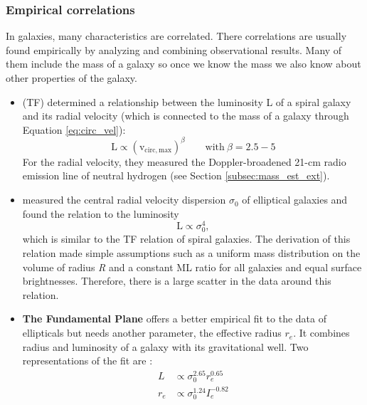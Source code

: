 \subsubsection{Empirical correlations}
In galaxies, many characteristics are correlated. There correlations are usually found empirically by analyzing and combining observational results. Many of them include the mass of a galaxy so once we know the mass we also know about other properties of the galaxy. 
\begin{itemize}
    \item \textbf{\citet{Tully...Fisher...1977}} (TF) determined a relationship between the luminosity L of a spiral galaxy and its radial velocity (which is connected to the mass of a galaxy through Equation \ref{eq:circ_vel}):
    \begin{equation}
        \mathrm{L \propto (v_{circ, max})}^\beta \qquad \mathrm{with}\ \beta =  2.5 - 5
    \end{equation}
    For the radial velocity, they measured the Doppler-broadened 21-cm radio emission line of neutral hydrogen (see Section \ref{subsec:mass_est_ext}). 
    \item \textbf{\citet{Faber...Jackson...1976}} measured the central radial velocity dispersion $\sigma_0$ of elliptical galaxies and found the relation to the luminosity  
    \begin{equation}
        \mathrm{L} \propto \sigma_0^4,
    \end{equation}
    which is similar to the \acs{TF} relation of spiral galaxies. The derivation of this relation made simple assumptions such as a uniform mass distribution on the volume of radius \textit{R} and a constant \ac{ML} ratio for all galaxies and equal surface brightnesses. Therefore, there is a large scatter in the data around this relation.
    \item \textbf{The Fundamental Plane} offers a better empirical fit to the data of ellipticals but needs another parameter, the effective radius $r_e$. It combines radius and luminosity of a galaxy with its gravitational well. Two representations of the fit are \citep{Carroll...Ostlie..2006}:
    \begin{align}
        L &\propto \sigma_0^{2.65}r_e^{0.65} \\
        r_e &\propto \sigma_0^{1.24}I_e^{-0.82}
    \end{align}
    \iffalse\item M\_vir - N\_GC \fi
\end{itemize}

